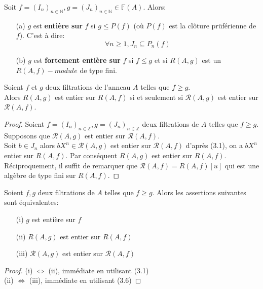 \begin{madefinition}
	Soit $f=(I_n)_{n \in \mathbb{N}} , g = (J_n)_{n \in \mathbb{N}}\in \mathbb{F}(A)$.  Alors:\\
	\begin{enumerate}
		\item[(a)]$g$ est \textbf{entière sur} $f$ si $g \leqslant P(f)$ (où $P(f)$ est la clôture prüférienne de $f$). C'est à dire:
		\[\forall n \geqslant 1, J_n \subseteq P_{n}(f) \]
		\item[(b)]$g$ est \textbf{fortement entière sur} $f$ si $f \leqslant g$ et si $R(A,g)$ est un $R(A,f)-module$ de type fini.
	\end{enumerate}
\end{madefinition}
\begin{maproposition}
	Soient $f$ et $g$ deux filtrations de l'anneau $A$ telles que $f \geqslant g$.\\ Alors $R(A,g)$ est entier sur $R(A,f)$ si et seulement si $\mathcal{R}(A,g)$ est entier sur $\mathcal{R}(A,f)$. 
\end{maproposition}
\begin{proof}
	Soient $f=(I_n)_{n \in \mathbb{Z}},g=(J_n)_{n \in \mathbb{Z}}$ deux filtrations de $A$ telles que $f \geqslant g$. \\ Supposons que $\mathcal{R}(A,g)$ est entier sur $\mathcal{R}(A,f)$. \\
	Soit $b \in J_n$ alors $bX^n \in \mathcal{R}(A,g)$ est entier sur $\mathcal{R}(A,f)$ d'après (3.1), on a $bX^n$ entier sur $R(A,f)$. Par conséquent $R(A,g)$ est entier sur $R(A,f)$.
	Réciproquement, il suffit de remarquer que $\mathcal{R}(A,f)=R(A,f)[u]$ qui est une algèbre de type fini sur $R(A,f)$.
\end{proof}
\begin{maproposition}
	Soient $f,g$ deux filtrations de $A$ telles que $f \geqslant g$. Alors les assertions suivantes sont équivalentes:
	\begin{enumerate}
		\item[(i)] $g$ est entière sur $f$
		\item[(ii)] $R(A,g)$ est entier sur $R(A,f)$
		\item[(iii)] $\mathcal{R}(A,g)$ est entier sur $\mathcal{R}(A,f)$
	\end{enumerate}
\end{maproposition}
\begin{proof}
	(i) $\Longleftrightarrow$ (ii), immédiate en utilisant (3.1) \\
	(ii) $\Longleftrightarrow$ (iii), immédiate en utilisant (3.6)
\end{proof}
